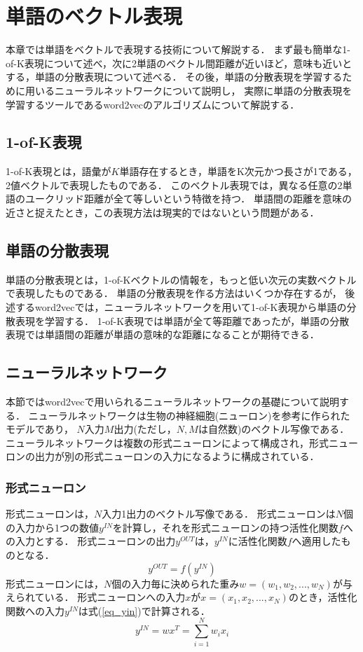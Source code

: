 \chapter{単語のベクトル表現}
本章では単語をベクトルで表現する技術について解説する．
まず最も簡単な1-of-K表現について述べ，次に2単語のベクトル間距離が近いほど，意味も近いとする，単語の分散表現について述べる．
その後，単語の分散表現を学習するために用いるニューラルネットワークについて説明し，
実際に単語の分散表現を学習するツールであるword2vecのアルゴリズムについて解説する．

\section{1-of-K表現}
1-of-K表現とは，語彙が$K$単語存在するとき，単語をK次元かつ長さが1である，2値ベクトルで表現したものである．
このベクトル表現では，異なる任意の2単語のユークリッド距離が全て等しいという特徴を持つ．
単語間の距離を意味の近さと捉えたとき，この表現方法は現実的ではないという問題がある．
\section{単語の分散表現}
単語の分散表現とは，1-of-Kベクトルの情報を，もっと低い次元の実数ベクトルで表現したものである．
単語の分散表現を作る方法はいくつか存在するが，
後述するword2vecでは，ニューラルネットワークを用いて1-of-K表現から単語の分散表現を学習する．
1-of-K表現では単語が全て等距離であったが，単語の分散表現では単語間の距離が単語の意味的な距離になることが期待できる．

\section{ニューラルネットワーク}
本節ではword2vecで用いられるニューラルネットワークの基礎について説明する．
ニューラルネットワークは生物の神経細胞(ニューロン)を参考に作られたモデルであり，
$N$入力$M$出力(ただし，$N, M$は自然数)のベクトル写像である．
ニューラルネットワークは複数の形式ニューロンによって構成され，形式ニューロンの出力が別の形式ニューロンの入力になるように構成されている．
\subsection{形式ニューロン}
形式ニューロンは，$N$入力1出力のベクトル写像である．
形式ニューロンは$N$個の入力から1つの数値$y^{IN}$を計算し，それを形式ニューロンの持つ活性化関数$f$への入力とする．
形式ニューロンの出力$y^{OUT}$は，$y^{IN}$に活性化関数$f$へ適用したものとなる．
\begin{equation}
    y^{OUT} = f(y^{IN}) \label{eq_neuron}
\end{equation}
形式ニューロンには，$N$個の入力毎に決められた重み$w=(w_1, w_2, ..., w_N)$が与えられている．
形式ニューロンへの入力$x$が$x=(x_1, x_2, ..., x_N)$のとき，活性化関数への入力$y^{IN}$は式(\ref{eq_yin})で計算される．
\begin{equation}
    y^{IN} = wx^T = \sum^N_{i=1}w_ix_i \label{eq_yin} 
\end{equation}

